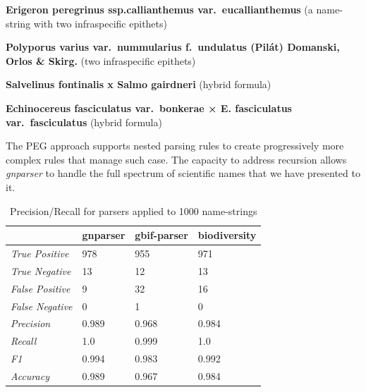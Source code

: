 \documentclass{bmcart}
\begin{document}
\textbf{Erigeron peregrinus ssp.callianthemus var.\ eucallianthemus} (a name-string with two infraspecific epithets)

\textbf{Polyporus varius var.\ nummularius f.\ undulatus (Pilát) Domanski, Orlos \& Skirg.} (two infraspecific epithets)

\textbf{Salvelinus fontinalis x Salmo gairdneri} (hybrid formula)

\textbf{Echinocereus fasciculatus var.\ bonkerae × E. fasciculatus var.\ fasciculatus} (hybrid formula)


\vspace{0.5cm}

The PEG approach supports nested parsing rules to create progressively more complex rules that manage such case. The capacity to address recursion allows \textit{gnparser} to handle the full spectrum of scientific names that we have presented to it.

\begin{table}[htb]
  \begin{center}
    \caption{Precision/Recall for parsers applied to 1000
    name-strings}\label{table:precision}
    \resizebox{10cm}{!} {\begin{tabular}{|l|*{3}{l}|}
      \hline
                             & gnparser & gbif-parser & biodiversity \\
      \hline
      \textit{True Positive} & 978      & 955         & 971          \\
      \textit{True Negative} & 13       & 12          & 13           \\
      \textit{False Positive}& 9        & 32          & 16           \\
      \textit{False Negative}& 0        & 1           & 0            \\
      \textit{Precision}     & 0.989    & 0.968       & 0.984        \\
      \textit{Recall}        & 1.0      & 0.999       & 1.0          \\
      \textit{F1}            & 0.994    & 0.983       & 0.992        \\
      \textit{Accuracy}      & 0.989    & 0.967       & 0.984        \\
      \hline
    \end{tabular}
    }
  \end{center}
\end{table}
\end{document}
